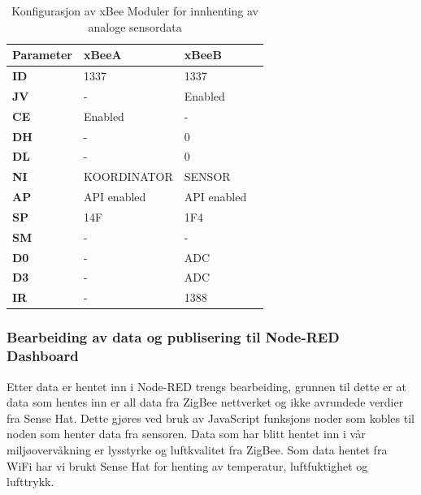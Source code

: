 \documentclass{article}
\begin{document}
\begin{table}
\centering
\caption{Konfigurasjon av xBee Moduler for innhenting av analoge sensordata}
\label{xBeeKonfigurasjon}
\begin{tabular}{|l|l|l|l|}
\hline
	\textbf{Parameter} 				& \textbf{xBeeA}  					& \textbf{xBeeB}			\\ \hline
	
	\textbf{ID} 					& 1337  						& 1337			\\ \hline
	
	\textbf{JV} 					&  -							& Enabled			\\ \hline
	
	\textbf{CE} 					&Enabled 					&  -					\\ \hline
	
	\textbf{DH} 					&  -							&  0					\\ \hline
	
	\textbf{DL}					&  -							&  0					\\ \hline

	\textbf{NI} 					&  KOORDINATOR		& SENSOR		\\ \hline

	\textbf{AP} 					&  API enabled			&  API enabled	\\ \hline

	\textbf{SP} 					&  14F						&  1F4				\\ \hline

	\textbf{SM} 					&  -							& -					\\ \hline
	
	\textbf{D0} 					&  -							&  ADC				\\ \hline

	\textbf{D3} 					&  -							&  ADC				\\ \hline

	\textbf{IR} 					&  -						&  1388					\\ \hline
\end{tabular}
\end{table}


\subsubsection{Bearbeiding av data og publisering til Node-RED Dashboard}

Etter data er hentet inn i Node-RED trengs bearbeiding, grunnen til dette er at data som hentes inn er all data fra ZigBee nettverket og ikke avrundede verdier fra Sense Hat. Dette gjøres ved bruk av JavaScript funksjons noder som kobles til noden som henter data fra sensoren. Data som har blitt hentet inn i vår miljøovervåkning er lysstyrke og luftkvalitet fra ZigBee. Som data hentet fra WiFi har vi brukt Sense Hat for henting av temperatur, luftfuktighet og lufttrykk. 
\end{document}
